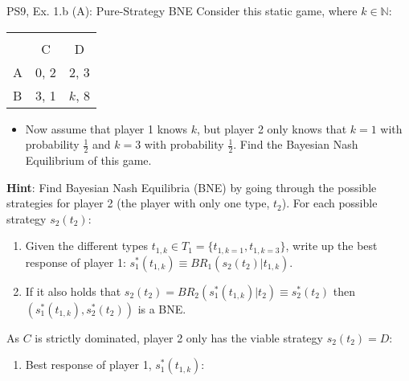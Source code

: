 \begin{frame}{PS9, Ex. 1.b (A): Pure-Strategy BNE}
    Consider this static game, where $k\in\mathbb{N}:$
    \vspace{-16pt}
    \begin{table}
      \begin{tabular}{l|c|c|}
        \multicolumn{1}{c}{} & \multicolumn{2}{c}{} \\
        \multicolumn{1}{c}{} & \multicolumn{1}{c}{C} & \multicolumn{1}{c}{D} \\\cline{2-3}
        A & 0, 2 & 2, 3 \\\cline{2-3}
        B & 3, 1 & $k$, 8 \\\cline{2-3}
      \end{tabular}
    \end{table}
    \vspace{-4pt}
    \begin{itemize}
      \item[(b)] Now assume that player 1 knows $k$, but player 2 only knows that $k = 1$ with probability $\frac{1}{2}$ and $k = 3$ with probability $\frac{1}{2}$. Find the Bayesian Nash Equilibrium of this game.
    \end{itemize}
    \vspace{-4pt}
    \begin{multicols}{2}
      \textbf{Hint}: Find Bayesian Nash Equilibria (BNE) by going through the possible strategies for player 2 (the player with only one type, $t_2$). For each possible strategy $s_2(t_2)$:
      \vspace{-4pt}
      \begin{enumerate}
        \item[Step 1:] Given the different types $t_{1,k}\in T_1=\{t_{1,k=1},t_{1,k=3}\}$, write up the best response of player 1: $s_1^*(t_{1,k})\equiv BR_1\left(s_2(t_2)|t_{1,k}\right)$.
        \item[Step 2:] If it also holds that $s_2(t_2)=BR_2\left(s_1^*(t_{1,k})|t_2\right)\equiv s_2^*(t_2)$ then $\left(s_1^*(t_{1,k}),s_2^*(t_2)\right)$ is a BNE.
      \end{enumerate}
      \vfill\null\columnbreak
      As $C$ is strictly dominated, player 2 only has the viable strategy $s_2(t_2)=D$:
      \begin{enumerate}\normalsize
        \item Best response of player 1, $s_1^*(t_{1,k}):$
      \end{enumerate}
      \vspace{-8pt}

\end{multicols}
\end{frame}
